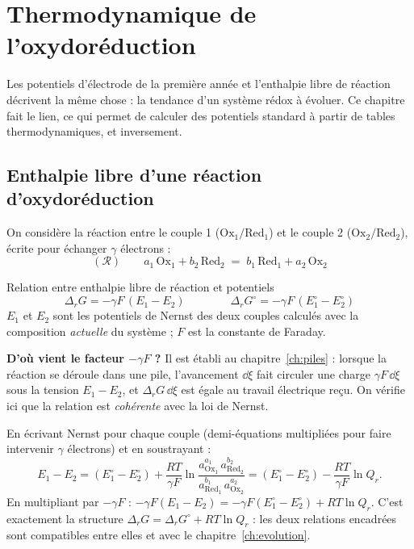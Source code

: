 \chapter{Thermodynamique de l'oxydoréduction}
\label{ch:redox}

Les potentiels d'électrode de la première année et l'enthalpie libre de réaction décrivent la même chose : la tendance d'un système rédox à évoluer. Ce chapitre fait le lien, ce qui permet de calculer des potentiels standard à partir de tables thermodynamiques, et inversement.

\section{Enthalpie libre d'une réaction d'oxydoréduction}

On considère la réaction entre le couple 1 ($\mathrm{Ox}_1/\mathrm{Red}_1$) et le couple 2 ($\mathrm{Ox}_2/\mathrm{Red}_2$), écrite pour échanger $\gamma$ électrons :
\[ (\mathcal{R})\qquad a_1\,\mathrm{Ox}_1 + b_2\,\mathrm{Red}_2 \;=\; b_1\,\mathrm{Red}_1 + a_2\,\mathrm{Ox}_2 \]

\begin{resultat}{Relation entre enthalpie libre de réaction et potentiels}
\[ \boxed{\Delta_rG = -\gamma F\,(E_1 - E_2)} \qquad\qquad \boxed{\Delta_rG^\circ = -\gamma F\,(E_1^\circ - E_2^\circ)} \]
$E_1$ et $E_2$ sont les potentiels de Nernst des deux couples calculés avec la composition \emph{actuelle} du système ; $F$ est la constante de Faraday.
\end{resultat}

\noindent\textbf{D'où vient le facteur $-\gamma F$ ?} Il est établi au chapitre~\ref{ch:piles} : lorsque la réaction se déroule dans une pile, l'avancement $\dd\xi$ fait circuler une charge $\gamma F\,\dd\xi$ sous la tension $E_1 - E_2$, et $\Delta_rG\,\dd\xi$ est égale au travail électrique reçu. On vérifie ici que la relation est \emph{cohérente} avec la loi de Nernst.

\begin{demo}
En écrivant Nernst pour chaque couple (demi-équations multipliées pour faire intervenir $\gamma$ électrons) et en soustrayant :
\[ E_1 - E_2 = (E_1^\circ - E_2^\circ) + \frac{RT}{\gamma F}\ln\frac{a_{\mathrm{Ox}_1}^{a_1}\,a_{\mathrm{Red}_2}^{b_2}}{a_{\mathrm{Red}_1}^{b_1}\,a_{\mathrm{Ox}_2}^{a_2}} = (E_1^\circ - E_2^\circ) - \frac{RT}{\gamma F}\ln Q_r. \]
En multipliant par $-\gamma F$ : $-\gamma F(E_1-E_2) = -\gamma F(E_1^\circ-E_2^\circ) + RT\ln Q_r$. C'est exactement la structure $\Delta_rG = \Delta_rG^\circ + RT\ln Q_r$ : les deux relations encadrées sont compatibles entre elles et avec le chapitre~\ref{ch:evolution}.
\end{demo}

